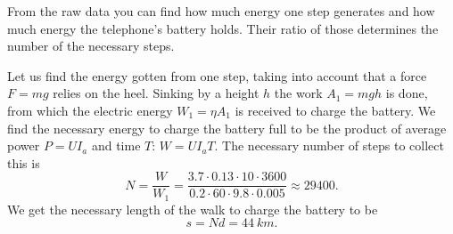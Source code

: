 {\ifEngHint
From the raw data you can find how much energy one step generates and how much energy the telephone’s battery holds. Their ratio of those determines the number of the necessary steps.
\fi


\ifEngSolution
Let us find the energy gotten from one step, taking into account that a force $F=mg$ relies on the heel. Sinking by a height $h$ the work $A_1 = mgh$ is done, from which the electric energy $W_1=\eta A_1$ is received to charge the battery. We find the necessary energy to charge the battery full to be the product of average power $P=UI_a$ and time $T$: $W=UI_aT$. The necessary number of steps to collect this is 
\[N = \frac{W}{W_1} = \frac{3.7 \cdot 0.13 \cdot 10 \cdot 3600 }{0.2 \cdot 60\cdot 9.8 \cdot 0.005}\approx29400.\]
We get the necessary length of the walk to charge the battery to be
\[s=Nd = \SI{44}{km}.\]
\fi
}